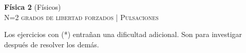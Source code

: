 \documentclass[11pt,spanish,a4paper]{article}
\begin{document}
\begin{center}
\textbf{Física 2} (Físicos) \hfill {}\\
	\textsc{\LARGE N=2 grados de libertad forzados | Pulsaciones}
\end{center}

Los ejercicios con (*) entrañan una dificultad adicional. Son para investigar después de resolver los demás.



\begin{enumerate}



								



\end{enumerate}
\end{document}
